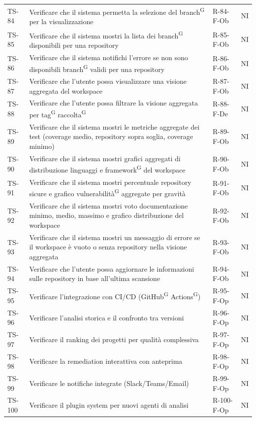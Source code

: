 \documentclass[a4paper, 11pt]{article}
\begin{document}
\begin{longtable}{>{\centering\arraybackslash}m{1.2cm} >{\raggedright\arraybackslash}p{8.2cm} >{\centering\arraybackslash}m{2.5cm} >{\centering\arraybackslash}m{1.2cm}}
TS-84 & Verificare che il sistema permetta la selezione del branch\textsuperscript{G} per la visualizzazione & R-84-F-Ob & NI \\
TS-85 & Verificare che il sistema mostri la lista dei branch\textsuperscript{G} disponibili per una repository & R-85-F-Ob & NI \\
TS-86 & Verificare che il sistema notifichi l'errore se non sono disponibili branch\textsuperscript{G} validi per una repository & R-86-F-Ob & NI \\
TS-87 & Verificare che l'utente possa visualizzare una visione aggregata del workspace & R-87-F-Ob & NI \\
TS-88 & Verificare che l'utente possa filtrare la visione aggregata per tag\textsuperscript{G} raccolta\textsuperscript{G} & R-88-F-De & NI \\
TS-89 & Verificare che il sistema mostri le metriche aggregate dei test (coverage medio, repository sopra soglia, coverage minimo) & R-89-F-Ob & NI \\
TS-90 & Verificare che il sistema mostri grafici aggregati di distribuzione linguaggi e framework\textsuperscript{G} del workspace & R-90-F-Ob & NI \\
TS-91 & Verificare che il sistema mostri percentuale repository sicure e grafico vulnerabilità\textsuperscript{G} aggregate per gravità & R-91-F-Ob & NI \\
TS-92 & Verificare che il sistema mostri voto documentazione minimo, medio, massimo e grafico distribuzione del workspace & R-92-F-Ob & NI \\
TS-93 & Verificare che il sistema mostri un messaggio di errore se il workspace è vuoto o senza repository nella visione aggregata & R-93-F-Ob & NI \\
TS-94 & Verificare che l'utente possa aggiornare le informazioni sulle repository in base all'ultima scansione & R-94-F-Ob & NI \\
TS-95 & Verificare l'integrazione con CI/CD (GitHub\textsuperscript{G} Actions\textsuperscript{G}) & R-95-F-Op & NI \\
TS-96 & Verificare l'analisi storica e il confronto tra versioni & R-96-F-Op & NI \\
TS-97 & Verificare il ranking dei progetti per qualità complessiva & R-97-F-Op & NI \\
TS-98 & Verificare la remediation interattiva con anteprima & R-98-F-Op & NI \\
TS-99 & Verificare le notifiche integrate (Slack/Teams/Email) & R-99-F-Op & NI \\
TS-100 & Verificare il plugin system per nuovi agenti di analisi & R-100-F-Op & NI \\

\end{longtable}
\end{document}
